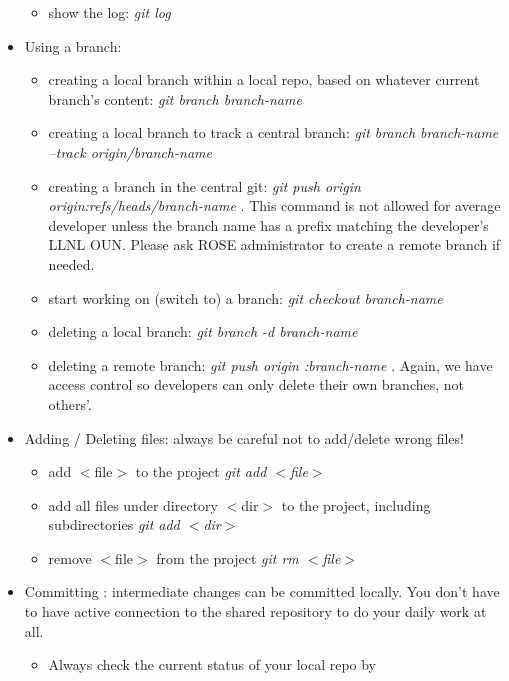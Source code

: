 \begin{itemize}
\begin{itemize}
          \item show the log: \textit{git log} 
   \end{itemize}       
\item Using a branch:
   \begin{itemize}
          \item creating a local branch within a local repo, based on
          whatever current branch's content: \textit{git branch branch-name} 
          \item creating a local branch to track a central branch: \textit{git branch branch-name --track origin/branch-name} 

          \item creating a branch in the central git: \textit{git push origin origin:refs/heads/branch-name} . This command is not
          allowed for average developer unless the branch name has a prefix
          matching the developer's LLNL OUN. Please ask ROSE administrator to create a remote branch if needed.
          \item start working on (switch to) a branch: \textit{git checkout branch-name} 
          \item deleting a local branch: \textit{git branch -d branch-name} 
          \item deleting a remote branch: \textit{git push origin
          :branch-name } . Again, we have access control so developers can
          only delete their own branches, not others'.
   \end{itemize}     
\item Adding / Deleting files: always be careful not to add/delete wrong files!
   \begin{itemize}
          \item add $<$file$>$ to the project \textit{git add $<$file$>$}
          \item add all files under directory $<$dir$>$ to the project, including subdirectories \textit{git add $<$dir$>$}
	  \item remove $<$file$>$ from the project \textit{git rm $<$file$>$}
   \end{itemize}     
\item Committing : intermediate changes can be committed locally. You don't have to have active connection to the shared repository to do your daily work at all. 
   \begin{itemize}
          \item Always check the current status of your local repo by

\end{itemize}
\end{itemize}
